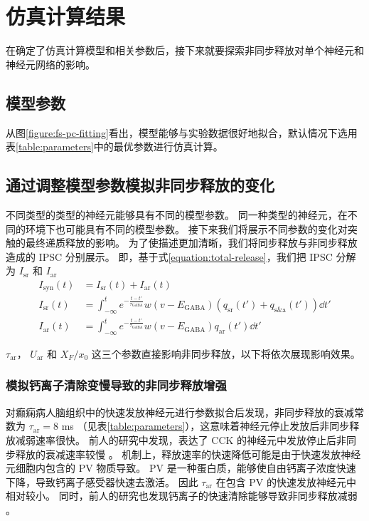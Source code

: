 \chapter{仿真计算结果}
\label{chapter:results}
在确定了仿真计算模型和相关参数后，接下来就要探索非同步释放对单个神经元和神经元网络的影响。

\section{模型参数}
\label{section:results:parameters}
从图\ref{figure:fs-pc-fitting}看出，模型能够与实验数据很好地拟合，默认情况下选用表\ref{table:parameters}中的最优参数进行仿真计算。

\section{通过调整模型参数模拟非同步释放的变化}
\label{section:result:modulate-asynchronous-release}
不同类型的类型的神经元能够具有不同的模型参数。
同一种类型的神经元，在不同的环境下也可能具有不同的模型参数。
接下来我们将展示不同参数的变化对突触的最终递质释放的影响。
为了使描述更加清晰，我们将同步释放与非同步释放造成的 IPSC 分别展示。
即，基于式\ref{equation:total-release}，我们把 IPSC 分解为 $I_\text{sr}$ 和 $I_\text{ar}$
\begin{align}
I_\text{syn}(t) &= I_\text{sr}(t) + I_\text{ar}(t) \\
I_\text{sr}(t) &= \int_{-\infty}^t e^{-\frac{t - t'}{\tau_\text{GABA}}} w(v - E_\text{GABA})\left( q_\text{sr}(t') + q_\text{s\&a}(t') \right) \dd{t'} \\
I_\text{ar}(t) &= \int_{-\infty}^t e^{-\frac{t - t'}{\tau_\text{GABA}}} w(v - E_\text{GABA})q_\text{ar}(t') \dd{t'}
\end{align}

$\tau_\text{ar}$， $U_\text{ar}$ 和 $X_F / x_0$ 这三个参数直接影响非同步释放，以下将依次展现影响效果。

\subsection{模拟钙离子清除变慢导致的非同步释放增强}
\label{section:result:modulate-with-tau-ar}
对癫痫病人脑组织中的快速发放神经元进行参数拟合后发现，非同步释放的衰减常数为 $\tau_\text{ar} = 8$ ms （见表\ref{table:parameters}），这意味着神经元停止发放后非同步释放减弱速率很快。
前人的研究中发现，表达了 CCK 的神经元中发放停止后非同步释放的衰减速率较慢 \cite{Hefft2005}。
机制上，释放速率的快速降低可能是由于快速发放神经元细胞内包含的 PV 物质导致。
PV 是一种蛋白质，能够使自由钙离子浓度快速下降，导致钙离子感受器快速去激活。
因此 $\tau_\text{ar}$ 在包含 PV 的快速发放神经元中相对较小。
同时，前人的研究也发现钙离子的快速清除能够导致非同步释放减弱 \cite{Jiang2015}。

